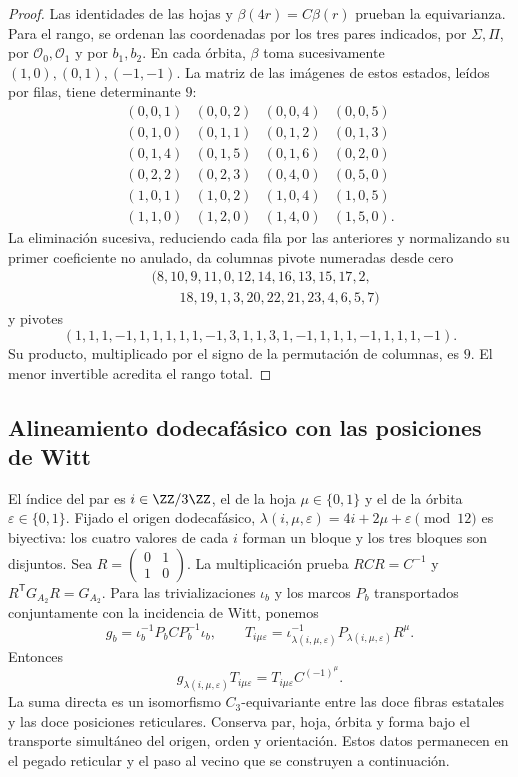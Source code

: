 \begin{proof}
Las identidades de las hojas y \(\beta(4r)=C\beta(r)\) prueban la
equivarianza. Para el rango, se ordenan las coordenadas por los tres
pares indicados, por \(\Sigma,\Pi\), por \(\mathcal O_0,\mathcal O_1\)
y por \(b_1,b_2\). En cada órbita, \(\beta\) toma sucesivamente
\((1,0),(0,1),(-1,-1)\). La matriz de las imágenes de estos estados,
leídos por filas, tiene determinante \(9\):
\[
\begin{array}{rrrr}
(0,0,1)&(0,0,2)&(0,0,4)&(0,0,5)\\
(0,1,0)&(0,1,1)&(0,1,2)&(0,1,3)\\
(0,1,4)&(0,1,5)&(0,1,6)&(0,2,0)\\
(0,2,2)&(0,2,3)&(0,4,0)&(0,5,0)\\
(1,0,1)&(1,0,2)&(1,0,4)&(1,0,5)\\
(1,1,0)&(1,2,0)&(1,4,0)&(1,5,0).
\end{array}
\]
La eliminación sucesiva, reduciendo cada fila por las anteriores y
normalizando su primer coeficiente no anulado, da columnas pivote
numeradas desde cero
\[
\begin{split}
&(8,10,9,11,0,12,14,16,13,15,17,2,\\
&\hspace{2em}18,19,1,3,20,22,21,23,4,6,5,7)
\end{split}
\]
y pivotes
\[
(1,1,1,-1,1,1,1,1,1,-1,3,1,1,3,1,-1,1,1,1,-1,1,1,1,-1).
\]
Su producto, multiplicado por el signo de la permutación de columnas,
es \(9\). El menor invertible acredita el rango total.
\end{proof}

\subsection{Alineamiento dodecafásico con las posiciones de Witt}
\label{nuclear:alineamiento-witt}
El índice del par es \(i\in\ZZ/3\ZZ\), el de la hoja
\(\mu\in\{0,1\}\) y el de la órbita \(\varepsilon\in\{0,1\}\).
Fijado el origen dodecafásico, \(\lambda(i,\mu,\varepsilon)
=4i+2\mu+\varepsilon\pmod{12}\) es biyectiva: los cuatro valores
de cada \(i\) forman un bloque y los tres bloques son disjuntos.
Sea \(R=\left(\begin{smallmatrix}0&1\\1&0\end{smallmatrix}\right)\).
La multiplicación prueba \(RCR=C^{-1}\) y
\(R^{\mathsf T}G_{A_2}R=G_{A_2}\). Para las trivializaciones
\(\iota_b\) y los marcos \(P_b\) transportados conjuntamente con
la incidencia de Witt, ponemos
\[
g_b=\iota_b^{-1}P_bCP_b^{-1}\iota_b,\qquad
T_{i\mu\varepsilon}=\iota_{\lambda(i,\mu,\varepsilon)}^{-1}
P_{\lambda(i,\mu,\varepsilon)}R^\mu.
\]
Entonces
\[
g_{\lambda(i,\mu,\varepsilon)}T_{i\mu\varepsilon}
=T_{i\mu\varepsilon}C^{(-1)^\mu}.
\]
La suma directa es un isomorfismo \(C_3\)-equivariante entre las doce
fibras estatales y las doce posiciones reticulares. Conserva par,
hoja, órbita y forma bajo el transporte simultáneo del origen,
orden y orientación. Estos datos permanecen en el pegado reticular
y el paso al vecino que se construyen a continuación.
